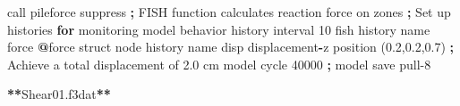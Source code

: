 \documentclass[a4paper, nobind]{templates/ociamthesis}
\newenvironment{Shaded}{\begin{snugshade}}{\end{snugshade}}
\newcommand{\ControlFlowTok}[1]{\textcolor[rgb]{0.13,0.29,0.53}{\textbf{#1}}}
\newcommand{\DecValTok}[1]{\textcolor[rgb]{0.00,0.00,0.81}{#1}}
\newcommand{\FloatTok}[1]{\textcolor[rgb]{0.00,0.00,0.81}{#1}}
\newcommand{\NormalTok}[1]{#1}
\newcommand{\OperatorTok}[1]{\textcolor[rgb]{0.81,0.36,0.00}{\textbf{#1}}}
\newcommand{\StringTok}[1]{\textcolor[rgb]{0.31,0.60,0.02}{#1}}
\renewenvironment{Shaded}
{
  \vspace{10pt}%
  \begin{snugshade}%
}{%
  \end{snugshade}%
  \vspace{8pt}%
}
\begin{document}
\begin{Shaded}
\begin{Highlighting}[]
\NormalTok{    call }\StringTok{\textquotesingle{}pileforce\textquotesingle{}}\NormalTok{ suppress }\OperatorTok{;}\NormalTok{ FISH function calculates reaction force on zones}
    \OperatorTok{;}\NormalTok{ Set up histories }\ControlFlowTok{for}\NormalTok{ monitoring model behavior}
\NormalTok{    history interval }\DecValTok{10}
\NormalTok{    fish history name }\StringTok{\textquotesingle{}force\textquotesingle{}} \OperatorTok{@}\NormalTok{force}
\NormalTok{    struct node history name }\StringTok{\textquotesingle{}disp\textquotesingle{}}\NormalTok{ displacement}\OperatorTok{{-}}\NormalTok{z position (}\FloatTok{0.2}\NormalTok{,}\FloatTok{0.2}\NormalTok{,}\FloatTok{0.7}\NormalTok{)}
    \OperatorTok{;}\NormalTok{ Achieve a total displacement of }\FloatTok{2.0}\NormalTok{ cm}
\NormalTok{    model cycle }\DecValTok{40000}
    \OperatorTok{;}
\NormalTok{    model save }\StringTok{\textquotesingle{}pull{-}8\textquotesingle{}}

\OperatorTok{**}\NormalTok{Shear01.f3dat}\OperatorTok{**}


\end{Highlighting}
\end{Shaded}
\end{document}
